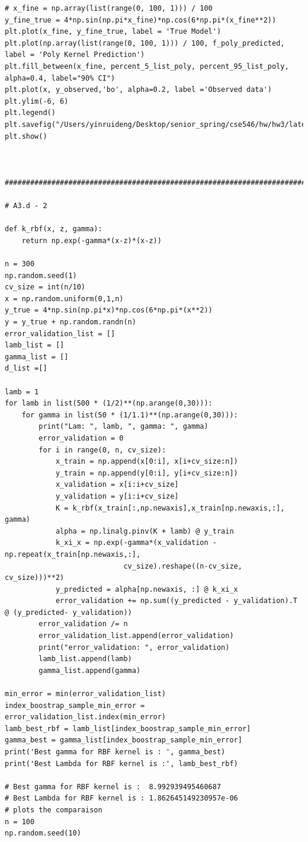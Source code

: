\documentclass{article}
\begin{document}
\begin{verbatim}
# x_fine = np.array(list(range(0, 100, 1))) / 100
y_fine_true = 4*np.sin(np.pi*x_fine)*np.cos(6*np.pi*(x_fine**2))
plt.plot(x_fine, y_fine_true, label = 'True Model')
plt.plot(np.array(list(range(0, 100, 1))) / 100, f_poly_predicted, label = 'Poly Kernel Prediction')
plt.fill_between(x_fine, percent_5_list_poly, percent_95_list_poly, alpha=0.4, label="90% CI")
plt.plot(x, y_observed,'bo', alpha=0.2, label ='Observed data')
plt.ylim(-6, 6)
plt.legend()
plt.savefig("/Users/yinruideng/Desktop/senior_spring/cse546/hw/hw3/latex/plots/A3e_1_test.png")
plt.show()



###################################################################################################################

# A3.d - 2

def k_rbf(x, z, gamma):
	return np.exp(-gamma*(x-z)*(x-z))

n = 300
np.random.seed(1)
cv_size = int(n/10)
x = np.random.uniform(0,1,n)
y_true = 4*np.sin(np.pi*x)*np.cos(6*np.pi*(x**2))
y = y_true + np.random.randn(n)
error_validation_list = []
lamb_list = []
gamma_list = []
d_list =[]

lamb = 1
for lamb in list(500 * (1/2)**(np.arange(0,30))):
	for gamma in list(50 * (1/1.1)**(np.arange(0,30))):
		print("Lam: ", lamb, ", gamma: ", gamma)
		error_validation = 0
		for i in range(0, n, cv_size):
			x_train = np.append(x[0:i], x[i+cv_size:n])
			y_train = np.append(y[0:i], y[i+cv_size:n])
			x_validation = x[i:i+cv_size]
			y_validation = y[i:i+cv_size]
			K = k_rbf(x_train[:,np.newaxis],x_train[np.newaxis,:], gamma)
			alpha = np.linalg.pinv(K + lamb) @ y_train
			k_xi_x = np.exp(-gamma*(x_validation - np.repeat(x_train[np.newaxis,:], 
							cv_size).reshape((n-cv_size, cv_size)))**2)
			y_predicted = alpha[np.newaxis, :] @ k_xi_x
			error_validation += np.sum((y_predicted - y_validation).T @ (y_predicted- y_validation))
		error_validation /= n
		error_validation_list.append(error_validation)
		print("error_validation: ", error_validation)
		lamb_list.append(lamb)
		gamma_list.append(gamma)

min_error = min(error_validation_list)
index_boostrap_sample_min_error = error_validation_list.index(min_error)
lamb_best_rbf = lamb_list[index_boostrap_sample_min_error]
gamma_best = gamma_list[index_boostrap_sample_min_error]
print('Best gamma for RBF kernel is : ', gamma_best)
print('Best Lambda for RBF kernel is :', lamb_best_rbf)

# Best gamma for RBF kernel is :  8.992939495460687
# Best Lambda for RBF kernel is : 1.862645149230957e-06
# plots the comparaison
n = 100
np.random.seed(10)


\end{verbatim}
\end{document}
